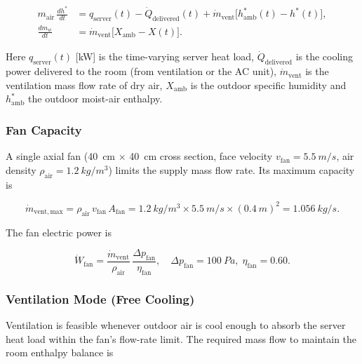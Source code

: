 \documentclass[12pt, a4paper]{article}
\newcommand{\mdot}{\dot{m}}
\newcommand{\Qdot}{\dot{Q}}
\newcommand{\Wdot}{\dot{W}}
\newcommand{\hstar}{h^{*}}
\begin{document}
\begin{align}
  m_{\mathrm{air}}\,\frac{d\hstar}{dt}
    &= q_{\mathrm{server}}(t) - \Qdot_{\mathrm{delivered}}(t)
       + \mdot_{\mathrm{vent}}\!\bigl[\hstar_{\mathrm{amb}}(t) - \hstar(t)\bigr],
  \label{eq:hstar_ode}\\[4pt]
  \frac{dm_w}{dt}
    &= \mdot_{\mathrm{vent}}\!\bigl[X_{\mathrm{amb}} - X(t)\bigr].
  \label{eq:mw_ode}
\end{align}

Here $q_{\mathrm{server}}(t)$ [\si{kW}] is the time-varying server heat load,
$\Qdot_{\mathrm{delivered}}$ is the cooling power delivered to the room (from ventilation
or the AC unit), $\mdot_{\mathrm{vent}}$ is the ventilation mass flow rate of dry
air, $X_{\mathrm{amb}}$ is the outdoor specific humidity and $\hstar_{\mathrm{amb}}$
the outdoor moist-air enthalpy.

\subsubsection{Fan Capacity}

A single axial fan (\SI{40}{cm} $\times$ \SI{40}{cm} cross section, face velocity
$v_{\mathrm{fan}} = \SI{5.5}{m/s}$, air density $\rho_{\mathrm{air}} = \SI{1.2}{kg/m^3}$) limits the
supply mass flow rate.
Its maximum capacity is

\begin{equation}
  \mdot_{\mathrm{vent,max}}
  = \rho_{\mathrm{air}}\,v_{\mathrm{fan}}\,A_{\mathrm{fan}}
  = \SI{1.2}{kg/m^3}\times\SI{5.5}{m/s}\times(\SI{0.4}{m})^2
  = \SI{1.056}{kg/s}.
  \label{eq:mdot_max}
\end{equation}

The fan electric power is

\begin{equation}
  \Wdot_{\mathrm{fan}}
  = \frac{\mdot_{\mathrm{vent}}}{\rho_{\mathrm{air}}}\,\frac{\Delta p_{\mathrm{fan}}}{\eta_{\mathrm{fan}}},
  \quad \Delta p_{\mathrm{fan}} = \SI{100}{Pa},\; \eta_{\mathrm{fan}} = 0.60.
\end{equation}

\subsubsection{Ventilation Mode (Free Cooling)}

Ventilation is feasible whenever outdoor air is cool enough to absorb the server heat load
within the fan's flow-rate limit.
The required mass flow to maintain the room enthalpy balance is
\end{document}
